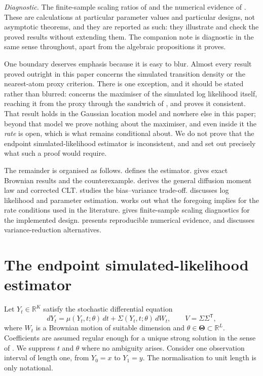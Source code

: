 \documentclass[11pt]{article}
\theoremstyle{definition}
\newcommand{\R}{\mathbb{R}}
\newcommand{\ThetaSet}{\boldsymbol{\Theta}}
\begin{document}
\emph{Diagnostic.} The finite-sample scaling ratios of  and the numerical evidence of . These are calculations at particular parameter values and particular designs, not asymptotic theorems, and they are reported as such: they illustrate and check the proved results without extending them. The companion note is diagnostic in the same sense throughout, apart from the algebraic propositions it proves.

One boundary deserves emphasis because it is easy to blur. Almost every result proved outright in this paper concerns the simulated transition density or the nearest-atom proxy criterion. There is one exception, and it should be stated rather than blurred:  concerns the maximiser of the simulated log likelihood itself, reaching it from the proxy through the sandwich of , and proves it consistent. That result holds in the Gaussian location model and nowhere else in this paper; beyond that model we prove nothing about the maximiser, and even inside it the \emph{rate} is open, which is what  remains conditional about. We do not prove that the endpoint simulated-likelihood estimator is inconsistent, and  and  set out precisely what such a proof would require.

The remainder is organised as follows.  defines the estimator.  gives exact Brownian results and the counterexample.  derives the general diffusion moment law and corrected CLT.  studies the bias--variance trade-off.  discusses log likelihood and parameter estimation.  works out what the foregoing implies for the rate conditions used in the literature.  gives finite-sample scaling diagnostics for the implemented design.  presents reproducible numerical evidence, and  discusses variance-reduction alternatives.

\FloatBarrier
\section{The endpoint simulated-likelihood estimator}\label{sec:estimator}

Let $Y_t\in\R^K$ satisfy the stochastic differential equation
\begin{equation}\label{eq:sde}
 dY_t=\mu(Y_t,t;\theta)\,dt+\Sigma(Y_t,t;\theta)\,dW_t,
 \qquad V=\Sigma\Sigma^{\mathsf T},
\end{equation}
where $W_t$ is a Brownian motion of suitable dimension and $\theta\in\ThetaSet\subset\R^L$. Coefficients are assumed regular enough for a unique strong solution in the sense of \citet{KaratzasShreve1991}. We suppress $t$ and $\theta$ where no ambiguity arises. Consider one observation interval of length one, from $Y_0=x$ to $Y_1=y$. The normalisation to unit length is only notational.
\end{document}
